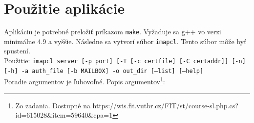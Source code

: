 \documentclass{article}
\begin{document}
\section{Použitie aplikácie}
Aplikáciu je potrebné preložiť príkazom \texttt{make}. Vyžaduje sa g++ vo verzi minimálne 4.9 a vyššie. Následne sa vytvorí súbor \texttt{imapcl}. Tento súbor môže byť spustení.\\
Použitie: \texttt{imapcl server [-p port] [-T [-c certfile] [-C certaddr]] [-n] [-h] -a auth\_file [-b MAILBOX] -o out\_dir [--list] [--help]}\\

Poradie argumentov je ľubovoľné. Popis argumentov\footnote{Zo zadania. Dostupné na https://wis.fit.vutbr.cz/FIT/st/course-sl.php.cs?id=615028\&item=59640\&cpa=1}:\\
\end{document}
